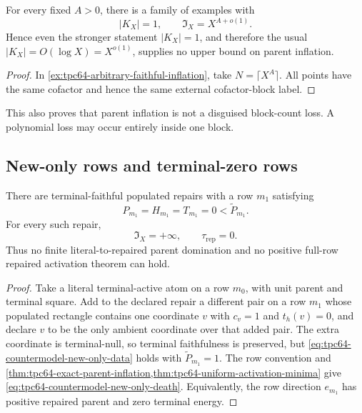 \begin{corollary}
\label{cor:tpc64-one-block-no-inflation-control}
For every fixed \(A>0\), there is a family of examples with
\begin{equation}
 |K_X|=1,\qquad
 \mathfrak I_X=X^{A+o(1)}.
 \label{eq:tpc64-one-block-polynomial-inflation}
\end{equation}
Hence even the stronger statement \(|K_X|=1\), and therefore the usual
\(|K_X|=O(\log X)=X^{o(1)}\), supplies no upper bound on parent inflation.
\end{corollary}

\begin{proof}
In \cref{ex:tpc64-arbitrary-faithful-inflation}, take
\(N=\lceil X^A\rceil\).  All points have the same cofactor and hence the
same external cofactor-block label.
\end{proof}

This also proves that parent inflation is not a disguised block-count
loss.  A polynomial loss may occur entirely inside one block.

\subsection{New-only rows and terminal-zero rows}

\begin{proposition}
\label{prop:tpc64-countermodel-new-only-row}
There are terminal-faithful populated repairs with a row \(m_1\) satisfying
\begin{equation}
 P_{m_1}=H_{m_1}=T_{m_1}=0
 <\widetilde P_{m_1}.
 \label{eq:tpc64-countermodel-new-only-data}
\end{equation}
For every such repair,
\begin{equation}
 \mathfrak I_X=+\infty,
 \qquad
 \tau_{\mathrm{rep}}=0.
 \label{eq:tpc64-countermodel-new-only-death}
\end{equation}
Thus no finite literal-to-repaired parent domination and no positive
full-row repaired activation theorem can hold.
\end{proposition}

\begin{proof}
Take a literal terminal-active atom on a row \(m_0\), with unit parent and
terminal square.  Add to the declared repair a different pair on a row
\(m_1\) whose populated rectangle contains one coordinate \(v\) with
\(c_v=1\) and \(t_h(v)=0\), and declare \(v\) to be the only ambient
coordinate over that added pair.  The extra coordinate is terminal-null, so
terminal faithfulness is preserved, but
\eqref{eq:tpc64-countermodel-new-only-data} holds with
\(\widetilde P_{m_1}=1\).  The row convention and
\cref{thm:tpc64-exact-parent-inflation,thm:tpc64-uniform-activation-minima}
give \eqref{eq:tpc64-countermodel-new-only-death}.  Equivalently, the row
direction \(e_{m_1}\) has positive repaired parent and zero terminal
energy.
\end{proof}

